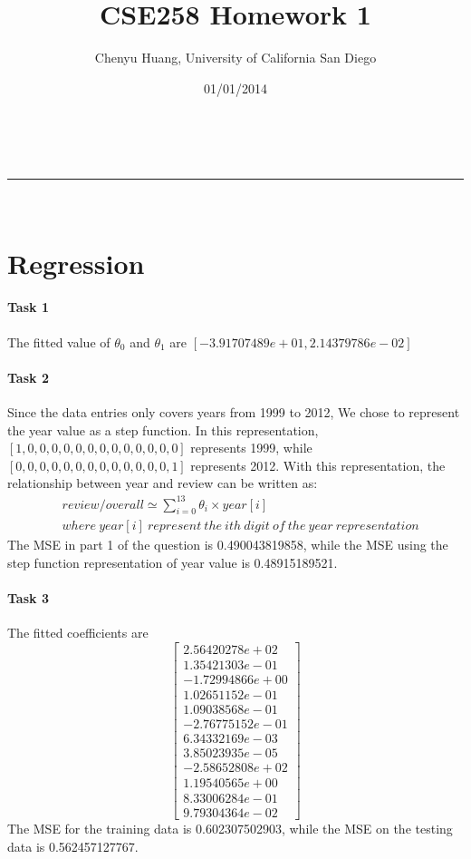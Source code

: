 \documentclass[a4paper,11pt]{article}
\makeatletter
\newcommand{\linia}{\rule{\linewidth}{0.5pt}}
\theoremstyle{mytheor}
\renewcommand{\maketitle}{
\begin{center}
\vspace{2ex}
{\huge \textsc{\@title}}
\vspace{1ex}
\\
\linia\\
\@author \hfill \@date
\vspace{4ex}
\end{center}
}
\makeatother
\begin{document}
\title{CSE258 Homework 1}

\author{Chenyu Huang, University of California San Diego}

\date{01/01/2014}

\maketitle

\section{Regression}

\paragraph{Task 1}

The fitted value of $\theta_0$ and $\theta_1$ are $[-3.91707489e+01, 2.14379786e-02]$

\paragraph{Task 2}

 Since the data entries only covers years from 1999 to 2012, We chose to represent the year value as a step function. In this representation, $[1, 0, 0, 0, 0, 0, 0, 0, 0, 0, 0, 0, 0, 0]$ represents 1999, while $[0, 0, 0, 0, 0, 0, 0, 0, 0, 0, 0, 0, 0, 1]$ represents 2012. With this representation, the relationship between year and review can be written as:
 \begin{align}
 	&review / overall \simeq \sum_{i=0}^{13} \theta_i \times year[i]\\
 	&where \ year[i] \ represent \ the \ ith \ digit \ of \ the \ year \ representation
 \end{align}
 The MSE in part 1 of the question is 0.490043819858, while the MSE using the step function representation of year value is 0.48915189521.

\paragraph{Task 3}

The fitted coefficients are
$$
\begin{bmatrix}
2.56420278e+02 \\  1.35421303e-01 \\ -1.72994866e+00  \\ 1.02651152e-01\\
1.09038568e-01 \\ -2.76775152e-01  \\ 6.34332169e-03  \\ 3.85023935e-05\\
-2.58652808e+02 \\  1.19540565e+00  \\ 8.33006284e-01 \\  9.79304364e-02
\end{bmatrix}
$$
The MSE for the training data is 0.602307502903, while the MSE on the testing data is 0.562457127767. 
\end{document}
